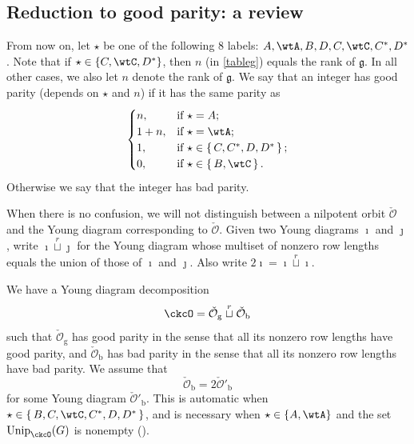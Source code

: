 \documentclass[11pt,a4paper]{amsart}
\newcommand{\CO}{{\mathcal {O}}}
\newcommand{\g}{\mathfrak g}
\newcommand{\be}{\begin {equation}}
\newcommand{\ee}{\end {equation}}
\numberwithin{equation}{section}
\theoremstyle{remark}
\def\Unip{\mathrm{Unip}}
\begin{document}
\subsection{Reduction to good parity: a review}\label{subsec:red}
From now on, let $\star$ be one of the following 8 labels: $A, \wtA, B, D, C, \wtC, C^{*}, D^{*}$. Note that if $\star\in \{C, \wtC, D^*\}$, then $n$ (in \eqref{tableg}) equals the rank of $\g$. In all other cases, we also let $n$ denote the rank of $\g$.
We say that an integer has good parity (depends on $\star$ and $n$) if it has the same parity as
\begin{equation}\label{parity}
  \begin{cases}
    n, &  \text{if $\star =A$}; \\
    1+ n, &  \text{if $\star = \wtA$}; \\
   1, & \text{if } \star \in \set{C,C^{*},D,D^{*}};\\
 \text{0}, & \text{if } \star \in \set{B,\wtC}.\\
  \end{cases}
\end{equation}
Otherwise we say that the integer has bad parity.


When there is no confusion, we will not distinguish between a nilpotent orbit $\check \CO$ and  the Young diagram corresponding to $\check \CO$. Given two Young diagrams $\imath$ and $\jmath$, write $\imath \stackrel{r}{\sqcup} \jmath$ for
the Young diagram whose multiset of nonzero row lengths equals the union of
those of $\imath$ and $\jmath$. Also write $2\imath =\imath \stackrel{r}{\sqcup} \imath$.

We have a Young diagram decomposition
\begin{equation*} %
     \ckcO=\check \CO_\mathrm g  \stackrel{r}{\sqcup} \check \CO_\mathrm b
\end{equation*}
 such that $\check \CO_\mathrm g$ has good parity in the sense that all its nonzero row lengths  have good parity,  and $\check \CO_\mathrm b$ has bad parity in the sense that all its nonzero row lengths  have bad parity.
 We assume that
 \be\label{doubleco}
 \check \CO_\mathrm b =2 \check \CO'_\mathrm b
 \ee
 for some Young diagram $\check \CO'_\mathrm b$. This is automatic when  $\star\in \set{B, C,\wtC, C^{*},D,D^{*}}$, and is necessary when $\star \in\{A, \wtA\}$ and the set $\Unip_{\ckcO}(G)$ is nonempty (\cite[Theorem 2.16]{BMSZa}).
\end{document}
